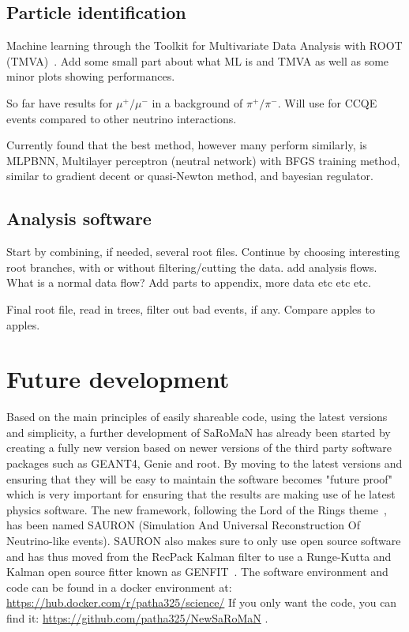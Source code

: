 

\subsection{Particle identification}
Machine learning through the Toolkit for Multivariate Data Analysis with ROOT (TMVA)~\cite{TMVA}. Add some small part about what ML is and TMVA as well as some minor plots showing performances.

So far have results for $\mu^+/\mu^-$ in a background of  $\pi^+/\pi^-$. Will use for CCQE events compared to other neutrino interactions.

Currently found that the best method, however many perform similarly, is MLPBNN, Multilayer perceptron (neutral network) with BFGS training method, similar to gradient decent or quasi-Newton method, and bayesian regulator.

\subsection{Analysis software}
Start by combining, if needed, several root files. Continue by choosing interesting root branches, with or without filtering/cutting the data.
add analysis flows. What is a normal data flow? Add parts to appendix, more data etc etc etc.

Final root file, read in trees, filter out bad events, if any. Compare apples to apples. 

\pagebreak
\section{Future development}
Based on the main principles of easily shareable code, using the latest versions and simplicity, a further development of SaRoMaN has already been started by creating a fully new version based on newer versions of the third party software packages such as GEANT4, Genie and root. By moving to the latest versions and ensuring that they will be easy to maintain the software becomes "future proof" which is very important for ensuring that the results are making use of he latest physics software. The new framework, following the Lord of the Rings theme~\cite{79tolkien2012lord}, has been named SAURON (Simulation And Universal Reconstruction Of Neutrino-like events).  SAURON also makes sure to only use open source software and has thus moved from the RecPack Kalman filter to use a Runge-Kutta and Kalman open source fitter known as GENFIT~\cite{81Genfit}.
The software environment and code can be found in  a docker environment at: \url{https://hub.docker.com/r/patha325/science/} If you only want the code, you can find it: \url{https://github.com/patha325/NewSaRoMaN} .


